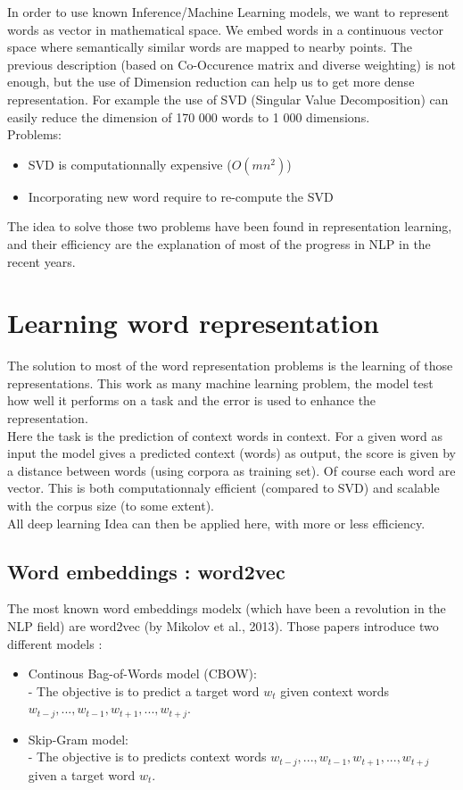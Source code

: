 			In order to use known Inference/Machine Learning models, we want to represent words as vector in mathematical space. We embed words in a continuous vector space where semantically similar words are mapped to nearby points. The previous description (based on Co-Occurence matrix and diverse weighting) is not enough, but the use of Dimension reduction can help us to get more dense representation. For example the use of SVD (Singular Value Decomposition) can easily reduce the dimension of 170 000 words to 1 000 dimensions. \\
			Problems:
			\begin{itemize}
				\item SVD is computationnally expensive ($O(mn^2)$)
				\item Incorporating new word require to re-compute the SVD
			\end{itemize}

			The idea to solve those two problems have been found in representation learning, and their efficiency are the explanation of most of the progress in NLP in the recent years.


	\section{Learning word representation}

		The solution to most of the word representation problems is the learning of those representations. This work as many machine learning problem, the model test how well it performs on a task and the error is used to enhance the representation. \\
		Here the task is the prediction of context words in context. For a given word as input the model gives a predicted context (words) as output, the score is given by a distance between words (using corpora as training set). Of course each word are vector. This is both computationnaly efficient (compared to SVD) and scalable with the corpus size (to some extent).\\
		All deep learning Idea can then be applied here, with more or less efficiency.

		\subsection{Word embeddings : word2vec}

			The most known word embeddings modelx (which have been a revolution in the NLP field) are word2vec (by Mikolov et al., 2013). Those papers  introduce two different models :
			\begin{itemize}
				\item Continous Bag-of-Words model (CBOW):\\
				- The objective is to predict a target word $w_t$ given context words $w_{t-j}, ..., w_{t-1}, w_{t+1}, ..., w_{t+j}$.
				\item Skip-Gram model:\\
				- The objective is to predicts context words  $w_{t-j}, ..., w_{t-1}, w_{t+1}, ..., w_{t+j}$ given a target word $w_t$.
			\end{itemize}

